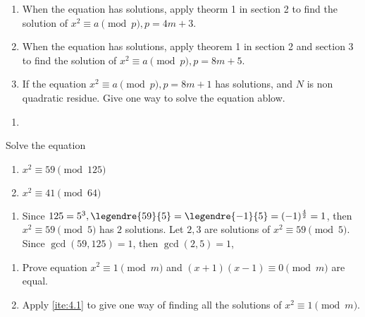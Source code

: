 \documentclass{ctexart}
\begin{document}
\begin{problem}\label{pro:2}
  \begin{enumerate}
    \item When the equation has solutions, apply theorm 1 in section 2 to
      find the solution of \(x^2 \equiv a \pmod{p}, p=4m + 3\).
    \item When the equation has solutions, apply theorem 1 in section 2 and section 3 to
      find the solution of \(x^2 \equiv a \pmod{p}, p=8m + 5\).
    \item If the equation \(x^2 \equiv a \pmod{p},p=8m + 1\) has solutions, and \(N \) is non quadratic residue.
      Give one way to solve the equation ablow.
  \end{enumerate}
  \begin{solution}
    \begin{enumerate}
      \item 
    \end{enumerate}
    
  \end{solution}
  
\end{problem}
\begin{problem}\label{pro:3}
 Solve the equation 
 \begin{enumerate}
   \item\( x^2  \equiv 59 \pmod{125} \)
   \item \(    x^2  \equiv 41 \pmod{64}\)
 \end{enumerate}
\end{problem}
\begin{solution}
  \begin{enumerate}
    \item Since \(125=5^3,\legendre{59}{5}=\legendre{-1}{5}=(-1)^{\frac{4}{2}}=1\), then \(x^2 \equiv 59 \pmod{5}\) has \(2\) solutions. 
      Let \(2,3\) are solutions of \(x^2 \equiv 59 \pmod{5}\). Since \(\gcd(59,125)=1\), then \(\gcd(2,5)=1\),
  \end{enumerate}
  
\end{solution}

\begin{problem}\label{pro:4}
  \begin{enumerate}
    \item \label{ite:4.1} Prove equation \(x^2 \equiv 1 \pmod{m}\) and \((x + 1)(x-1) \equiv 0 \pmod{m}\) are equal.
    \item Apply \ref{ite:4.1} to give one way of finding all the solutions of \(x^2 \equiv 1 \pmod{m}\).
  \end{enumerate}
\end{problem}
\end{document}
